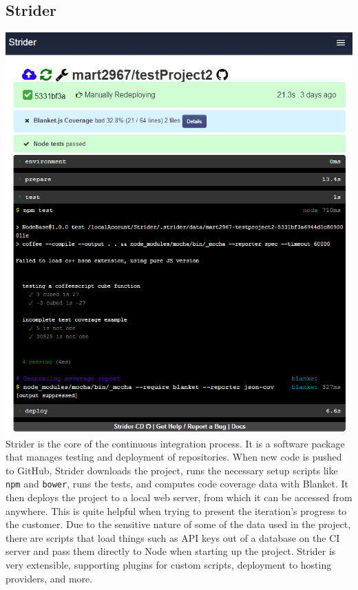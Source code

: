 \documentclass[12pt]{article}
\newcommand{\code}[1]{{\texttt {#1}}}
\begin{document}
\subsection{Strider}\label{sec:strider}
\includegraphics[width=\linewidth]{img/strider_2.png}
Strider is the core of the continuous integration process. It is a software package that manages testing and deployment of repositories. When new code is pushed to GitHub, Strider downloads the project, runs the necessary setup scripts like \code{npm} and \code{bower}, runs the tests, and computes code coverage data with Blanket. It then deploys the project to a local web server, from which it can be accessed from anywhere. This is quite helpful when trying to present the iteration's progress to the customer. Due to the sensitive nature of some of the data used in the project, there are scripts that load things such as API keys out of a database on the CI server and pass them directly to Node when starting up the project. Strider is very extensible, supporting plugins for custom scripts, deployment to hosting providers, and more.
\end{document}

